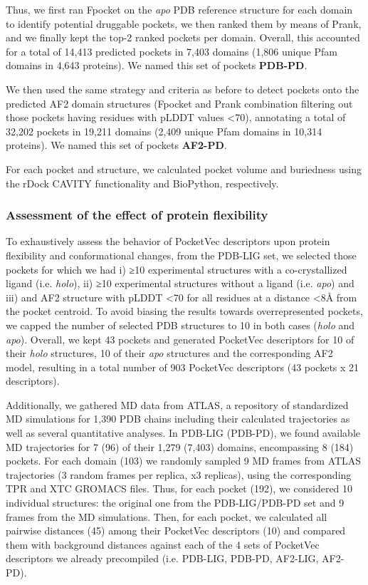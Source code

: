 Thus, we first ran Fpocket on the \textit{apo} PDB reference structure for each domain to identify potential druggable pockets, we then ranked them by means of Prank, and we finally kept the top-2 ranked pockets per domain. Overall, this accounted for a total of 14,413 predicted pockets in 7,403 domains (1,806 unique Pfam domains in 4,643 proteins). We named this set of pockets \textbf{PDB-PD}.

We then used the same strategy and criteria as before to detect pockets onto the predicted AF2 domain structures (Fpocket and Prank combination filtering out those pockets having residues with pLDDT values <70), annotating a total of 32,202 pockets in 19,211 domains (2,409 unique Pfam domains in 10,314 proteins). We named this set of pockets \textbf{AF2-PD}.

For each pocket and structure, we calculated pocket volume and buriedness using the rDock CAVITY functionality\cite{ruiz-carmona_rdock_2014} and BioPython\cite{cock_biopython_2009}, respectively.

\subsubsection{Assessment of the effect of protein flexibility}

To exhaustively assess the behavior of PocketVec descriptors upon protein flexibility and conformational changes, from the PDB-LIG set, we selected those pockets for which we had i) ≥10 experimental structures with a co-crystallized ligand (i.e. \textit{holo}), ii) ≥10 experimental structures without a ligand (i.e. \textit{apo}) and iii) and AF2 structure with pLDDT <70 for all residues at a distance <8Å from the pocket centroid. To avoid biasing the results towards overrepresented pockets, we capped the number of selected PDB structures to 10 in both cases (\textit{holo} and \textit{apo}). Overall, we kept 43 pockets and generated PocketVec descriptors for 10 of their \textit{holo} structures, 10 of their \textit{apo} structures and the corresponding AF2 model, resulting in a total number of 903 PocketVec descriptors (43 pockets x 21 descriptors).

Additionally, we gathered MD data from ATLAS\cite{vandermeersche_atlas_2024}, a repository of standardized MD simulations for 1,390 PDB chains including their calculated trajectories as well as several quantitative analyses. In PDB-LIG (PDB-PD), we found available MD trajectories for 7 (96) of their 1,279 (7,403) domains, encompassing 8 (184) pockets. For each domain (103) we randomly sampled 9 MD frames from ATLAS trajectories (3 random frames per replica, x3 replicas), using the corresponding TPR and XTC GROMACS files. Thus, for each pocket (192), we considered 10 individual structures: the original one from the PDB-LIG/PDB-PD set and 9 frames from the MD simulations. Then, for each pocket, we calculated all pairwise distances (45) among their PocketVec descriptors (10) and compared them with background distances against each of the 4 sets of PocketVec descriptors we already precompiled (i.e. PDB-LIG, PDB-PD, AF2-LIG, AF2-PD).

